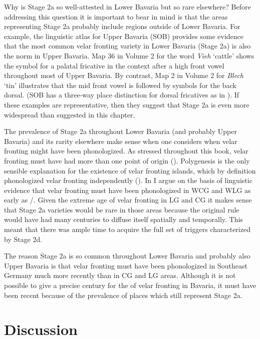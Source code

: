 Why is Stage 2a so well-attested in Lower Bavaria but so rare elsewhere? Before addressing this question it is important to bear in mind is that the areas representing Stage 2a probably include regions outside of Lower Bavaria. For example, the linguistic atlas for Upper Bavaria (SOB) provides some evidence that the most common velar fronting variety in Lower Bavaria (Stage 2a) is also the norm in Upper Bavaria. Map 36 in Volume 2 for the word \textit{Vieh} ‘cattle’ shows the symbol for a palatal fricative in the context after a high front vowel throughout most of Upper Bavaria. By contrast, Map 2 in Volume 2 for \textit{Blech} ‘tin’ illustrates that the mid front vowel is followed by symbols for the back dorsal. (SOB has a three-way place distinction for dorsal fricatives as in ). If these examples are representative, then they suggest that Stage 2a is even more widespread than suggested in this chapter.

The prevalence of Stage 2a throughout Lower Bavaria (and probably Upper Bavaria) and its rarity elsewhere make sense when one considers when velar fronting might have been phonologized. As stressed throughout this book, velar fronting must have had more than one point of origin (). Polygenesis is the only sensible explanation for the existence of velar fronting islands, which by definition phonologized velar fronting independently ().  In  I argue on the basis of linguistic evidence that velar fronting must have been phonologized in WCG and WLG as early as /. Given the extreme age of velar fronting in LG and CG it makes sense that Stage 2a varieties would be rare in those areas because the original rule would have had many centuries to diffuse itself spatially and temporally. This meant that there was ample time to acquire the full set of triggers characterized by Stage 2d.

The reason Stage 2a is so common throughout Lower Bavaria and probably also Upper Bavaria is that velar fronting must have been phonologized in Southeast Germany much more recently than in CG and LG areas. Although it is not possible to give a precise century for the  of velar fronting in Bavaria, it must have been recent because of the prevalence of places which still represent Stage 2a.

\section{{Discussion}}\label{sec:13.5}

